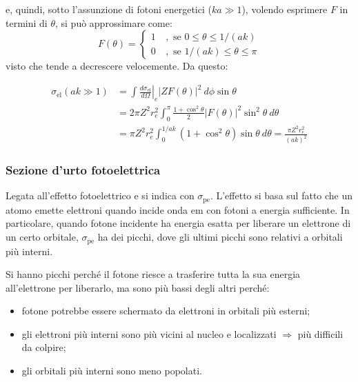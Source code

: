\documentclass[10pt, a4paper]{scrartcl}
\newcommand*\Eval[3]{\left.#1\right\rvert_{#2}^{#3}}
\numberwithin{equation}{subsection}
\theoremstyle{style1}
\newenvironment{boxenv}[1][]{
    \begin{eqbox}[#1]
    }{
   \end{eqbox}
}
\begin{document}
e, quindi, sotto l'assunzione di fotoni energetici ($k a \gg 1$), volendo esprimere $F$ in termini di $\theta $, si pu\`o approssimare come:
\begin{equation}
	F(\theta ) = \begin{cases}
		1 & \ , \text{ se } 0\le \theta \le  1 / (ak)\\
		0 & \ , \text{ se } 1/(ak) \le  \theta \le  \pi
	\end{cases}
\end{equation}
visto che tende a decrescere velocemente. Da questo:
\begin{boxenv}[]
\begin{equation}
	\begin{split}
		\sigma _\text{el}(ak\gg 1) &= \int \Eval{\frac{d \sigma _\text{el}}{d \Omega } }{e}{} \lvert Z F(\theta ) \rvert ^2 \ d\phi  \sin \theta \\
		&= 2 \pi Z^2 r_e^2 \int_{0} ^\pi \frac{1+ \cos^2 \theta }{2}\lvert F(\theta ) \rvert ^2 \sin^2 \theta  \ d\theta \\
		&= \pi Z^2 r_e^2  \int_{0} ^{1 / ak} (1+ \cos^2 \theta ) \sin \theta \ d\theta = \frac{\pi Z^2 r_e^2}{(ak)^2}
	\end{split}
\end{equation}
\end{boxenv}
\subsubsection{Sezione d'urto fotoelettrica}
Legata all'effetto fotoelettrico e si indica con $\sigma _\text{pe}$. L'effetto si basa sul fatto che un atomo emette elettroni quando incide onda em con fotoni a energia sufficiente. In particolare, quando fotone incidente ha energia esatta per liberare un elettrone di un certo orbitale, $\sigma _\text{pe}$ ha dei picchi, dove gli ultimi picchi sono relativi a orbitali pi\`u interni. 

Si hanno picchi perch\'e il fotone riesce a trasferire tutta la sua energia all'elettrone per liberarlo, ma sono pi\`u bassi degli altri perch\'e:
\begin{itemize}
	\item fotone potrebbe essere schermato da elettroni in orbitali pi\`u esterni;
	\item gli elettroni pi\`u interni sono pi\`u vicini al nucleo e localizzati $\Rightarrow $ pi\`u difficili da colpire;
	\item gli orbitali pi\`u interni sono meno popolati.
\end{itemize}
\end{document}
